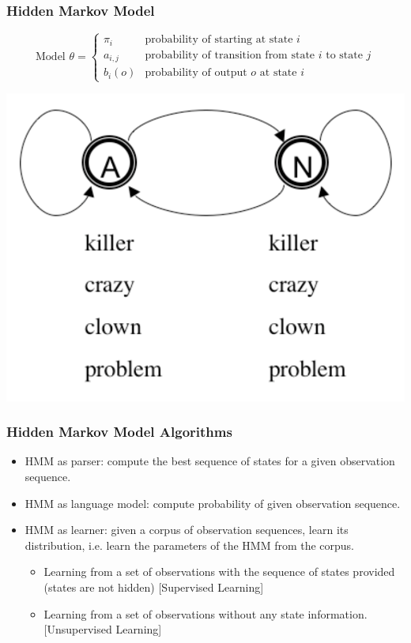 \begin{frame}
\frametitle{Hidden Markov Model}
\[
\textrm{Model $\theta$} = \left\{ 
\begin{array}{ll} 
\pi_i & \textrm{probability of starting at state $i$} \\ 
a_{i,j} & \textrm{probability of transition from state $i$ to state $j$} \\ 
b_i(o) & \textrm{probability of output $o$ at state $i$}
\end{array} 
\right.\]

\begin{center}
\includegraphics[scale=.4]{figures/hmmfig}
\end{center}
\end{frame}

\begin{frame}
\frametitle{Hidden Markov Model Algorithms}
\begin{itemize}
\item HMM as parser: compute the best sequence of states for a given observation sequence.
\item HMM as language model: compute probability of given observation sequence.
\item HMM as learner: given a corpus of observation sequences, learn its distribution, i.e. learn the parameters of the HMM from the corpus.
\begin{itemize}
\item Learning from a set of observations with the sequence of states provided (states are not hidden) {\color{blue} [Supervised Learning]}
\item Learning from a set of observations without any state information. {\color{blue} [Unsupervised Learning]}
\end{itemize}
\end{itemize}
\end{frame}

